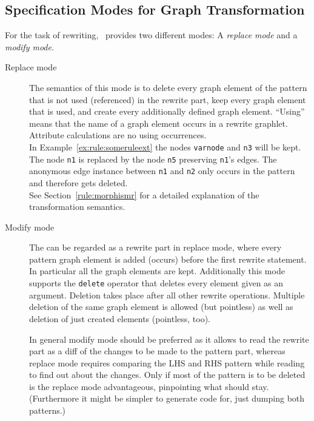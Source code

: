 \subsection{Specification Modes for Graph Transformation}
For the task of rewriting, \GrG\ provides two different modes: A \emph{replace mode} and a \emph{modify mode}.
\begin{description}
  \item[Replace mode] The semantics of this mode is to delete every graph element of the pattern that is not used (referenced) in the rewrite part, keep every graph element that is used, and create every additionally defined graph element. ``Using'' means that the name of a graph element occurs in a rewrite graphlet. Attribute calculations are no using occurrences.\\
  In Example~\ref{ex:rule:someruleext} the nodes \texttt{varnode} and \texttt{n3} will be kept. The node \texttt{n1} is replaced by the node \texttt{n5} preserving \texttt{n1}'s edges. The anonymous edge instance between \texttt{n1} and \texttt{n2} only occurs in the pattern and therefore gets deleted.\\
See Section~\ref{rule:morphismr} for a detailed explanation of the transformation semantics.
  \item[Modify mode] The  can be regarded as a rewrite part in replace mode, where every pattern graph element is added (occurs) before the first rewrite statement.
In particular all the  graph elements are kept.
Additionally this mode supports the \texttt{delete} operator that deletes every element given as an argument.
Deletion takes place after all other rewrite operations. Multiple deletion of the same graph element is allowed (but pointless) as well as deletion of just created elements (pointless, too).

\begin{note}
In general modify mode should be preferred as it allows to read the rewrite part as a diff of the changes to be made to the pattern part, whereas replace mode requires comparing the LHS and RHS pattern while reading to find out about the changes.
Only if most of the pattern is to be deleted is the replace mode advantageous, pinpointing what should stay.
(Furthermore it might be simpler to generate code for, just dumping both patterns.)
\end{note}


\end{description}
